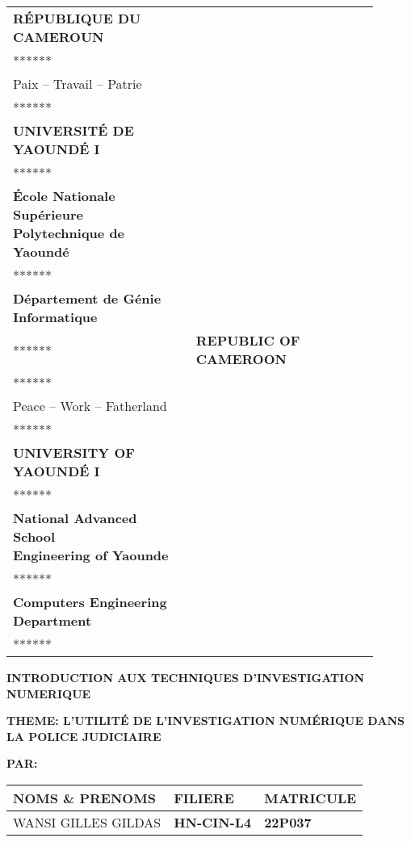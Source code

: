 \documentclass[12pt,a4paper]{article}
\begin{document}
\begin{titlepage}
    \centering

\begin{tabular}{p{0.45\linewidth} p{0.45\linewidth}}
\centering
\textbf{RÉPUBLIQUE DU CAMEROUN}\\
******\\
Paix -- Travail -- Patrie\\
******\\
\textbf{UNIVERSITÉ DE YAOUNDÉ I}\\
******\\
\textbf {École Nationale Supérieure\\
Polytechnique de Yaoundé}\\
******\\
\textbf {Département de Génie Informatique}\\
****** &
\centering
\textbf{REPUBLIC OF CAMEROON}\\
******\\
Peace -- Work -- Fatherland\\
******\\
\textbf{UNIVERSITY OF YAOUNDÉ I}\\
******\\
\textbf {National Advanced School\\
Engineering of Yaounde}\\
******\\
\textbf {Computers Engineering Department}\\
****** \\
\end{tabular}
\vspace{2cm}

    \begin{LARGE}

    \textbf{INTRODUCTION AUX TECHNIQUES D'INVESTIGATION NUMERIQUE}
    \end{LARGE}

    \vspace{2cm}

    \begin{Large}
    \textbf{THEME: L'UTILITÉ DE L'INVESTIGATION NUMÉRIQUE DANS LA POLICE JUDICIAIRE}
    \end{Large}
    
    \vspace{5cm}
	
	
	
	\begin{flushleft}
	\textbf{PAR:}
	\end{flushleft}
    \begin{tabular}{|>{\centering\arraybackslash}p{7cm}|>{\centering\arraybackslash}p{4cm}|>{\centering\arraybackslash}p{3cm}|}
        \hline
        \textbf{NOMS \& PRENOMS} & \textbf{FILIERE  } & \textbf{MATRICULE} \\
        \hline
        WANSI GILLES GILDAS & \textbf{HN-CIN-L4} & \textbf{22P037} \\
        \hline
    \end{tabular}


\end{titlepage}
\end{document}
